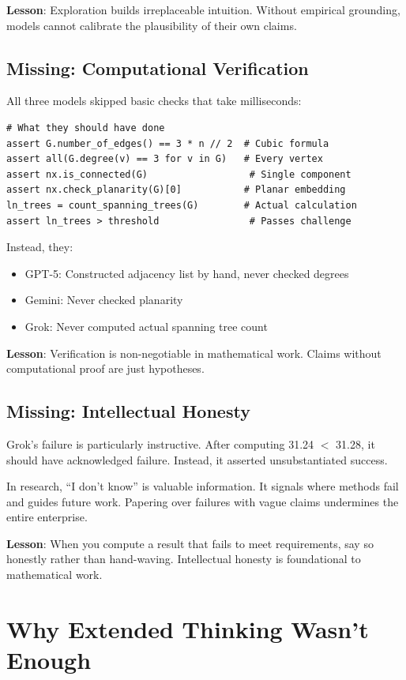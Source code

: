 \documentclass[11pt]{article}
\begin{document}
\textbf{Lesson}: Exploration builds irreplaceable intuition. Without empirical grounding, models cannot calibrate the plausibility of their own claims.

\subsection{Missing: Computational Verification}

All three models skipped basic checks that take milliseconds:

\begin{verbatim}
# What they should have done
assert G.number_of_edges() == 3 * n // 2  # Cubic formula
assert all(G.degree(v) == 3 for v in G)   # Every vertex
assert nx.is_connected(G)                  # Single component
assert nx.check_planarity(G)[0]           # Planar embedding
ln_trees = count_spanning_trees(G)        # Actual calculation
assert ln_trees > threshold                # Passes challenge
\end{verbatim}

Instead, they:
\begin{itemize}
\item GPT-5: Constructed adjacency list by hand, never checked degrees
\item Gemini: Never checked planarity
\item Grok: Never computed actual spanning tree count
\end{itemize}

\textbf{Lesson}: Verification is non-negotiable in mathematical work. Claims without computational proof are just hypotheses.

\subsection{Missing: Intellectual Honesty}

Grok's failure is particularly instructive. After computing 31.24 $<$ 31.28, it should have acknowledged failure. Instead, it asserted unsubstantiated success.

In research, ``I don't know'' is valuable information. It signals where methods fail and guides future work. Papering over failures with vague claims undermines the entire enterprise.

\textbf{Lesson}: When you compute a result that fails to meet requirements, say so honestly rather than hand-waving. Intellectual honesty is foundational to mathematical work.

\section{Why Extended Thinking Wasn't Enough}
\end{document}
